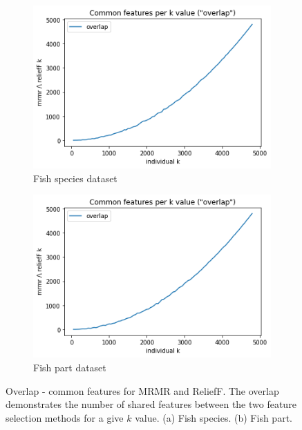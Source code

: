 \documentclass{article}
\begin{document}
\begin{figure}[htb]
  \centering
  \begin{subfigure}[b]{\linewidth}
    \includegraphics[width=1\linewidth]{fish_k_overlap.png}
    \caption{Fish species dataset}
    \label{fig:fish-k-overlap}
  \end{subfigure}

  \begin{subfigure}[b]{\linewidth}
    \includegraphics[width=1\linewidth]{part_k_overlap.png}
    \caption{Fish part dataset}
    \label{fig:part-k-overlap}
  \end{subfigure}
  \caption[Two numerical solutions]{
    Overlap - common features for MRMR and ReliefF.
    The overlap demonstrates the number of shared features between the two feature selection methods for a give $k$ value.
    (a) Fish species. (b) Fish part.}
  \label{fig:fs-overlap}
\end{figure}
\end{document}
